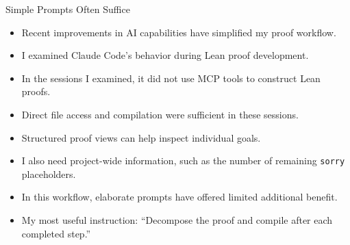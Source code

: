 \documentclass[aspectratio=169,xcolor=dvipsnames]{beamer}
\begin{document}
\begin{frame}{Simple Prompts Often Suffice}
    \begin{itemize}
        \item Recent improvements in AI capabilities have simplified my proof workflow.
        \item I examined Claude Code's behavior during Lean proof development.
        \item In the sessions I examined, it did not use MCP tools to construct Lean proofs.
        \item Direct file access and compilation were sufficient in these sessions.
        \item Structured proof views can help inspect individual goals.
        \item I also need project-wide information, such as the number of remaining \texttt{sorry} placeholders.
        \item In this workflow, elaborate prompts have offered limited additional benefit.
        \item My most useful instruction: ``Decompose the proof and compile after each completed step.''
    \end{itemize}
\end{frame}
\end{document}
